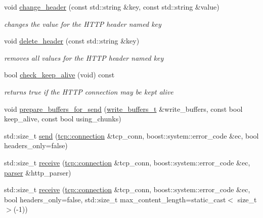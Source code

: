 \begin{DoxyCompactItemize}
void \hyperlink{classpion_1_1http_1_1message_aa1643164e7f60bae1b640d55735a4728}{change\-\_\-header} (const std\-::string \&key, const std\-::string \&value)
\begin{DoxyCompactList}\small\item\em changes the value for the H\-T\-T\-P header named key \end{DoxyCompactList}\item 
void \hyperlink{classpion_1_1http_1_1message_a070ef742af75674725da392c25774884}{delete\-\_\-header} (const std\-::string \&key)
\begin{DoxyCompactList}\small\item\em removes all values for the H\-T\-T\-P header named key \end{DoxyCompactList}\item 
bool \hyperlink{classpion_1_1http_1_1message_ab0aa463a1327eac0d73ff6ab62ca3891}{check\-\_\-keep\-\_\-alive} (void) const 
\begin{DoxyCompactList}\small\item\em returns true if the H\-T\-T\-P connection may be kept alive \end{DoxyCompactList}\item 
void \hyperlink{classpion_1_1http_1_1message_a668182618dfc614ddbe6c1af26552568}{prepare\-\_\-buffers\-\_\-for\-\_\-send} (\hyperlink{classpion_1_1http_1_1message_aacf9a6a7677c32e4ab764ac97d0b5e7b}{write\-\_\-buffers\-\_\-t} \&write\-\_\-buffers, const bool keep\-\_\-alive, const bool using\-\_\-chunks)
\item 
std\-::size\-\_\-t \hyperlink{classpion_1_1http_1_1message_ab90f91badb0f98f900a7624418781bea}{send} (\hyperlink{classpion_1_1tcp_1_1connection}{tcp\-::connection} \&tcp\-\_\-conn, boost\-::system\-::error\-\_\-code \&ec, bool headers\-\_\-only=false)
\item 
std\-::size\-\_\-t \hyperlink{classpion_1_1http_1_1message_a7e3c3f1ea265f91b87a9e075234b5d31}{receive} (\hyperlink{classpion_1_1tcp_1_1connection}{tcp\-::connection} \&tcp\-\_\-conn, boost\-::system\-::error\-\_\-code \&ec, \hyperlink{classpion_1_1http_1_1parser}{parser} \&http\-\_\-parser)
\item 
std\-::size\-\_\-t \hyperlink{classpion_1_1http_1_1message_a029d3c6260deabf91fdcc9f1f0157268}{receive} (\hyperlink{classpion_1_1tcp_1_1connection}{tcp\-::connection} \&tcp\-\_\-conn, boost\-::system\-::error\-\_\-code \&ec, bool headers\-\_\-only=false, std\-::size\-\_\-t max\-\_\-content\-\_\-length=static\-\_\-cast$<$ size\-\_\-t $>$(-\/1))
\item 

\end{DoxyCompactItemize}
